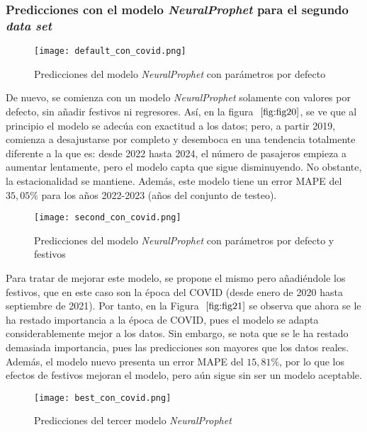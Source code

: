 \documentclass[12pt,twoside]{article}
\begin{document}
\subsubsection{Predicciones con el modelo \textit{NeuralProphet} para el segundo \textit{data set}}\label{sec:33}

\begin{figure}[h]
    \centering
    \texttt{[image: default\_con\_covid.png]}
    \caption{Predicciones del modelo \textit{NeuralProphet} con parámetros por defecto} 
    \label{fig:fig20}
\end{figure}

De nuevo, se comienza con un modelo \textit{NeuralProphet} solamente con valores por defecto, sin añadir festivos ni regresores. Así, en la figura $~\ref{fig:fig20}$, se ve que al principio el modelo se adecúa con exactitud a los datos; pero, a partir 2019, comienza a desajustarse por completo y desemboca en una tendencia totalmente diferente a la que es: desde 2022 hasta 2024, el número de pasajeros empieza a aumentar lentamente, pero el modelo capta que sigue disminuyendo. No obstante, la estacionalidad se mantiene. Además, este modelo tiene un error MAPE del $35,05\%$ para los años 2022-2023 (años del conjunto de testeo).

\begin{figure}[h]
    \centering
    \texttt{[image: second\_con\_covid.png]}
    \caption{Predicciones del modelo \textit{NeuralProphet} con parámetros por defecto y festivos} 
    \label{fig:fig21}
\end{figure}

Para tratar de mejorar este modelo, se propone el mismo pero añadiéndole los festivos, que en este caso son la época del COVID (desde enero de 2020 hasta septiembre de 2021). Por tanto, en la Figura $~\ref{fig:fig21}$ se observa que ahora se le ha restado importancia a la época de COVID, pues el modelo se adapta considerablemente mejor a los datos. Sin embargo, se nota que se le ha restado demasiada importancia, pues las predicciones son mayores que los datos reales. Además, el modelo nuevo presenta un error MAPE del $15,81\%$, por lo que los efectos de festivos mejoran el modelo, pero aún sigue sin ser un modelo aceptable.

\begin{figure}[h]
    \centering
    \texttt{[image: best\_con\_covid.png]}
    \caption{Predicciones del tercer modelo \textit{NeuralProphet}} 
    \label{fig:fig22}
\end{figure}
\end{document}
